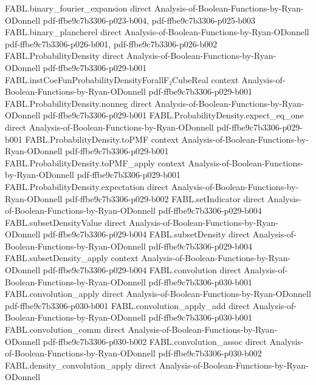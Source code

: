 \begin{theorem}
  {FABL.binary_fourier_expansion}
  {direct}
  {Analysis-of-Boolean-Functions-by-Ryan-ODonnell}
  {pdf-ffbe9c7b3306-p023-b004,
    pdf-ffbe9c7b3306-p025-b003}
\proofstep
  {FABL.binary_plancherel}
  {direct}
  {Analysis-of-Boolean-Functions-by-Ryan-ODonnell}
  {pdf-ffbe9c7b3306-p026-b001,
    pdf-ffbe9c7b3306-p026-b002}
\proofstep
  {FABL.ProbabilityDensity}
  {direct}
  {Analysis-of-Boolean-Functions-by-Ryan-ODonnell}
  {pdf-ffbe9c7b3306-p029-b001}
\proofstep
  {FABL.instCoeFunProbabilityDensityForallF₂CubeReal}
  {context}
  {Analysis-of-Boolean-Functions-by-Ryan-ODonnell}
  {pdf-ffbe9c7b3306-p029-b001}
\proofstep
  {FABL.ProbabilityDensity.nonneg}
  {direct}
  {Analysis-of-Boolean-Functions-by-Ryan-ODonnell}
  {pdf-ffbe9c7b3306-p029-b001}
\proofstep
  {FABL.ProbabilityDensity.expect_eq_one}
  {direct}
  {Analysis-of-Boolean-Functions-by-Ryan-ODonnell}
  {pdf-ffbe9c7b3306-p029-b001}
\proofstep
  {FABL.ProbabilityDensity.toPMF}
  {context}
  {Analysis-of-Boolean-Functions-by-Ryan-ODonnell}
  {pdf-ffbe9c7b3306-p029-b001}
\proofstep
  {FABL.ProbabilityDensity.toPMF_apply}
  {context}
  {Analysis-of-Boolean-Functions-by-Ryan-ODonnell}
  {pdf-ffbe9c7b3306-p029-b001}
\proofstep
  {FABL.ProbabilityDensity.expectation}
  {direct}
  {Analysis-of-Boolean-Functions-by-Ryan-ODonnell}
  {pdf-ffbe9c7b3306-p029-b002}
\proofstep
  {FABL.setIndicator}
  {direct}
  {Analysis-of-Boolean-Functions-by-Ryan-ODonnell}
  {pdf-ffbe9c7b3306-p029-b004}
\proofstep
  {FABL.subsetDensityValue}
  {direct}
  {Analysis-of-Boolean-Functions-by-Ryan-ODonnell}
  {pdf-ffbe9c7b3306-p029-b004}
\proofstep
  {FABL.subsetDensity}
  {direct}
  {Analysis-of-Boolean-Functions-by-Ryan-ODonnell}
  {pdf-ffbe9c7b3306-p029-b004}
\proofstep
  {FABL.subsetDensity_apply}
  {context}
  {Analysis-of-Boolean-Functions-by-Ryan-ODonnell}
  {pdf-ffbe9c7b3306-p029-b004}
\proofstep
  {FABL.convolution}
  {direct}
  {Analysis-of-Boolean-Functions-by-Ryan-ODonnell}
  {pdf-ffbe9c7b3306-p030-b001}
\proofstep
  {FABL.convolution_apply}
  {direct}
  {Analysis-of-Boolean-Functions-by-Ryan-ODonnell}
  {pdf-ffbe9c7b3306-p030-b001}
\proofstep
  {FABL.convolution_apply_add}
  {direct}
  {Analysis-of-Boolean-Functions-by-Ryan-ODonnell}
  {pdf-ffbe9c7b3306-p030-b001}
\proofstep
  {FABL.convolution_comm}
  {direct}
  {Analysis-of-Boolean-Functions-by-Ryan-ODonnell}
  {pdf-ffbe9c7b3306-p030-b002}
\proofstep
  {FABL.convolution_assoc}
  {direct}
  {Analysis-of-Boolean-Functions-by-Ryan-ODonnell}
  {pdf-ffbe9c7b3306-p030-b002}
\proofstep
  {FABL.density_convolution_apply}
  {direct}
  {Analysis-of-Boolean-Functions-by-Ryan-ODonnell}

\end{theorem}
